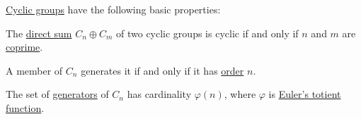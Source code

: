 \begin{proposition}\label{thm:def:cyclic_group}
  \hyperref[def:cyclic_group]{Cyclic groups} have the following basic properties:
  \begin{thmenum}
     The \hyperref[def:semimodule_direct_sum]{direct sum} \( C_n \oplus C_m \) of two cyclic groups is cyclic if and only if \( n \) and \( m \) are \hyperref[def:coprime_elements]{coprime}.

     A member of \( C_n \) generates it if and only if it has \hyperref[def:group_element_order]{order} \( n \).

     The set of \hyperref[def:group_presentation]{generators} of \( C_n \) has cardinality \( \varphi(n) \), where \( \varphi \) is \hyperref[def:eulers_totient_function]{Euler's totient function}.
  \end{thmenum}
\end{proposition}
